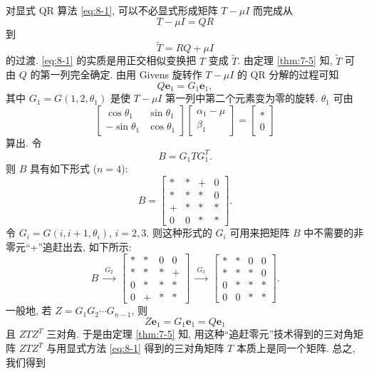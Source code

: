 对显式 QR 算法 \eqref{eq:8-1}, 可以不必显式形成矩阵 $T-\mu I$ 而完成从
\[
  T-\mu I=QR
\]
到
\[
  \tilde{T}=RQ+\mu I
\]
的过渡. \eqref{eq:8-1} 的实质是用正交相似变换把 $T$ 变成 $\tilde{T}$. 由定理 \ref{thm:7-5} 知, $\tilde{T}$ 可由 $Q$ 的第一列完全确定. 由用 Givens 旋转作 $T-\mu I$ 的 QR 分解的过程可知
\[
  Q\mathbf{e}_1=G_1\mathbf{e}_1,
\]
其中 $G_1=G(1,2,\theta_1)$ 是使 $T-\mu I$ 第一列中第二个元素变为零的旋转. $\theta_1$ 可由
\[
  \begin{bmatrix}
    \cos\theta_1 & \sin\theta_1\\
    -\sin\theta_1 & \cos\theta_1
  \end{bmatrix}
  \begin{bmatrix}
    \alpha_1-\mu\\
    \beta_1
  \end{bmatrix}
  =\begin{bmatrix}
    *\\
    0
  \end{bmatrix}
\]
算出. 令
\[
  B=G_1TG_1^T.
\]
则 $B$ 具有如下形式 ($n=4$):
\[
  B=\begin{bmatrix}
    * & * & + & 0\\
    * & * & * & 0\\
    + & * & * & *\\
    0 & 0 & * & *
  \end{bmatrix}.
\]
令 $G_i=G(i,i+1,\theta_i)$, $i=2,3$. 则这种形式的 $G_i$ 可用来把矩阵 $B$ 中不需要的非零元``+''追赶出去, 如下所示:
\[
  B\ \xrightarrow{\ G_2\ }\
  \begin{bmatrix}
    * & * & 0 & 0\\
    * & * & * & +\\
    0 & * & * & *\\
    0 & + & * & *
  \end{bmatrix}
  \ \xrightarrow{\ G_3\ }\
  \begin{bmatrix}
    * & * & 0 & 0\\
    * & * & * & 0\\
    0 & * & * & *\\
    0 & 0 & * & *
  \end{bmatrix}.
\]
一般地, 若 $Z=G_1G_2\cdots G_{n-1}$, 则
\[
  Z\mathbf{e}_1=G_1\mathbf{e}_1=Q\mathbf{e}_1
\]
且 $ZTZ^T$ 三对角. 于是由定理 \ref{thm:7-5} 知, 用这种``追赶零元''技术得到的三对角矩阵 $ZTZ^T$ 与用显式方法 \eqref{eq:8-1} 得到的三对角矩阵 $T$ 本质上是同一个矩阵. 总之, 我们得到

